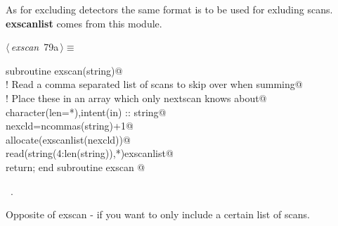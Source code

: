 \documentclass[10pt,a4paper,notitlepage]{article}
\newcommand{\var}[1]{\textbf{\textsf{#1}}} %
\begin{document}
\begin{flushleft}
\begin{minipage}{\linewidth}
\begin{list}{}{\setlength{\itemsep}{-\parsep}\setlength{\itemindent}{-\leftmargin}}
\item{}
\end{list}
\end{minipage}\vspace{4ex}
\end{flushleft}
As for excluding detectors the same format is to be used for exluding scans.
\var{exscanlist} comes from this module.

\begin{flushleft} \small
\begin{minipage}{\linewidth}\label{scrap88}\raggedright\small
{} $\langle\,${\it exscan}\nobreak\ {\footnotesize {79a}}$\,\rangle\equiv$
\vspace{-1ex}
\begin{list}{}{} \item
\mbox{}\verb@      subroutine exscan(string)@\\
\mbox{}\verb@! Read a comma separated list of scans to skip over when summing@\\
\mbox{}\verb@! Place these in an array which only nextscan knows about@\\
\mbox{}\verb@      character(len=*),intent(in) :: string@\\
\mbox{}\verb@      nexcld=ncommas(string)+1@\\
\mbox{}\verb@      allocate(exscanlist(nexcld))@\\
\mbox{}\verb@      read(string(4:len(string)),*)exscanlist@\\
\mbox{}\verb@      return;  end subroutine exscan                                       @{\NWsep}
\end{list}
\vspace{-1.5ex}
\footnotesize
\begin{list}{}{\setlength{\itemsep}{-\parsep}\setlength{\itemindent}{-\leftmargin}}
\item \NWtxtMacroRefIn\ .

\item{}
\end{list}
\end{minipage}\vspace{4ex}
\end{flushleft}
Opposite of exscan - if you want to only include a certain list of scans.
\end{document}
